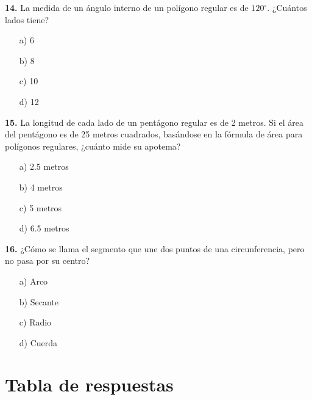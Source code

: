 \noindent\textbf{14.} La medida de un ángulo interno de un polígono regular es de $120^\circ$. ¿Cuántos lados tiene?

\begin{itemize}
    \item[a)] 6
    \item[b)] 8
    \item[c)] 10
    \item[d)] 12
\end{itemize}

\noindent\textbf{15.} La longitud de cada lado de un pentágono regular es de 2 metros. Si el área del pentágono es de 25 metros cuadrados, basándose en la fórmula de área para polígonos regulares, ¿cuánto mide su apotema?

\begin{itemize}
    \item[a)] 2.5 metros
    \item[b)] 4 metros
    \item[c)] 5 metros
    \item[d)] 6.5 metros
\end{itemize}

\noindent\textbf{16.} ¿Cómo se llama el segmento que une dos puntos de una circunferencia, pero no pasa por su centro?

\begin{itemize}
    \item[a)] Arco
    \item[b)] Secante
    \item[c)] Radio
    \item[d)] Cuerda
\end{itemize}


\newpage

\section*{Tabla de respuestas}

